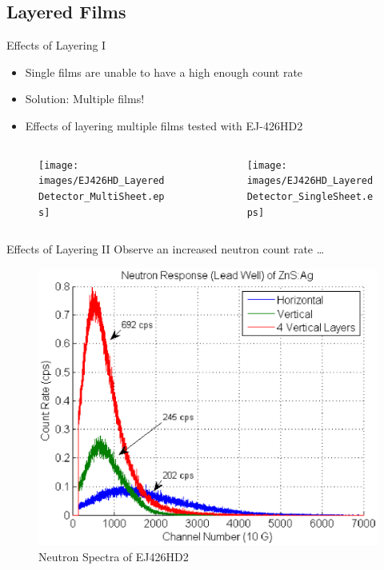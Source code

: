 \subsection{Layered Films}
\begin{frame}{Effects of Layering I}
\small
\begin{itemize}
	\item Single films are unable to have a high enough count rate
	\item Solution: Multiple films!
	\item Effects of layering multiple films tested with EJ-426HD2
\end{itemize}
\begin{columns}[onlytextwidth]
\begin{column}{0.45\textwidth}
	\tiny
	\begin{figure}
		\centering
		\texttt{[image: images/EJ426HD\_LayeredDetector\_MultiSheet.eps]}
	\end{figure}
\end{column}
\begin{column}{0.45\textwidth}
	\tiny
	\begin{figure}
		\centering
		\texttt{[image: images/EJ426HD\_LayeredDetector\_SingleSheet.eps]}
	\end{figure}
\end{column}
\end{columns}
\end{frame}
\begin{frame}{Effects of Layering II}
Observe an increased neutron count rate \dots
	\begin{figure}
		\centering
		\includegraphics[height=0.6\textheight]{images/EJ426HD_Multi_NeutronComparison.eps}
		\small \caption{Neutron Spectra of EJ426HD2}
	\end{figure}
\end{frame}
